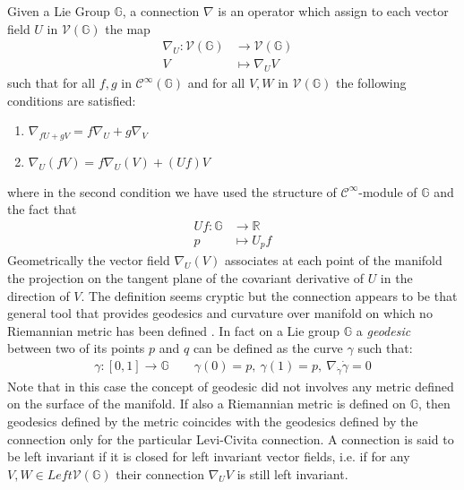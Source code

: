 Given a Lie Group $\mathbb{G}$, a connection $\nabla$ is an operator which assign to each vector field $U$ in $\mathcal{V}(\mathbb{G})$ the map
\begin{align*}
\nabla_{U} : \mathcal{V}(\mathbb{G}) & \longrightarrow  \mathcal{V}(\mathbb{G}) &   \\
V &\longmapsto  \nabla_{U}V
\end{align*}
such that for all $f,g$ in $\mathcal{C}^{\infty}(\mathbb{G})$ and for all $V,W$ in $\mathcal{V}(\mathbb{G})$ the following conditions are satisfied:
\begin{enumerate}
	\item $ \nabla_{fU + gV} = f\nabla_{U} + g\nabla_{V}$
	\item $\nabla_{U}(fV) = f \nabla_{U}(V) + (Uf)V $
\end{enumerate}
where in the second condition we have used the structure of  $\mathcal{C}^{\infty}$-module of $\mathbb{G}$ and the fact that 
\begin{align*}
Uf: \mathbb{G} & \longrightarrow  \mathbb{R}    \\
p &\longmapsto  U_{p}f
\end{align*}
Geometrically the vector field $\nabla_{U}(V)$ associates at each point of the manifold the projection on the tangent plane of the covariant derivative of $U$ in the direction of $V$. The definition seems cryptic but the connection appears to be that general tool that provides geodesics and curvature over manifold on which no Riemannian metric has been defined \cite{do1992riemannian}.
In fact on a Lie group $\mathbb{G}$ a \emph{geodesic} between two of its points $p$ and $q$ can be defined as the curve $\gamma$ such that:
\begin{align*}
\gamma:[0,1] \longrightarrow \mathbb{G} \qquad \gamma(0)=p,~ \gamma(1) = p,~ \nabla_{\dot{\gamma}}\dot{\gamma} = 0 
\end{align*} 
Note that in this case the concept of geodesic did not involves any metric defined on the surface of the manifold. If also a Riemannian metric is defined on $\mathbb{G} $, then geodesics defined by the metric coincides with the geodesics defined by the connection only for the particular Levi-Civita connection.
A connection is said to be left invariant if it is closed for left invariant vector fields, i.e. if for any $V, W \in Left\mathcal{V}(\mathbb{G}) $ their connection $ \nabla_{U}V$ is still left invariant.

